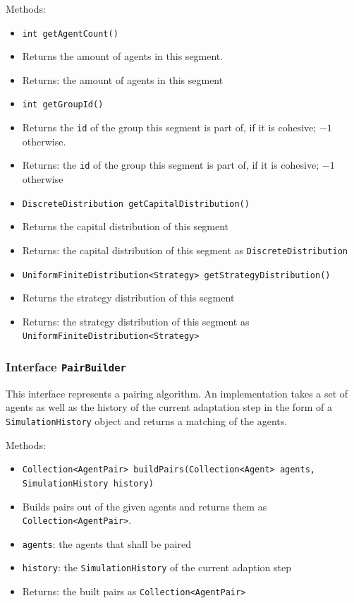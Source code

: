 \documentclass[parskip=full,11pt]{scrartcl}
\begin{document}
Methods:
\begin{itemize}\itemsep -10pt
\item \texttt{int getAgentCount()}
\item[] Returns the amount of agents in this segment.
\item[] Returns: the amount of agents in this segment

\item \texttt{int getGroupId()}
\item[] Returns the \texttt{id} of the group this segment is part of, if it is cohesive; \(-1\) otherwise.
\item[] Returns: the \texttt{id} of the group this segment is part of, if it is cohesive; \(-1\) otherwise

\item \texttt{DiscreteDistribution getCapitalDistribution()}
\item[] Returns the capital distribution of this segment
\item[] Returns: the capital distribution of this segment as \texttt{DiscreteDistribution}

\item \texttt{UniformFiniteDistribution<Strategy> getStrategyDistribution()}
\item[] Returns the strategy distribution of this segment
\item[] Returns: the strategy distribution of this segment as \texttt{UniformFiniteDistribution<Strategy>}
\end{itemize}

\subsubsection{Interface \texttt{PairBuilder}}
This interface represents a pairing algorithm. An implementation takes a set of agents as well as the history of the current adaptation step in the form of a \texttt{SimulationHistory} object and returns a matching of the agents.

Methods:
\begin{itemize}\itemsep -10pt
\item \texttt{Collection<AgentPair> buildPairs(Collection<Agent> agents, SimulationHistory history)}
\item[] Builds pairs out of the given agents and returns them as \texttt{Collection<AgentPair>}.
\item[] \texttt{agents}: the agents that shall be paired
\item[] \texttt{history}: the \texttt{SimulationHistory} of the current adaption step
\item[] Returns: the built pairs as \texttt{Collection<AgentPair>}
\end{itemize}
\end{document}
